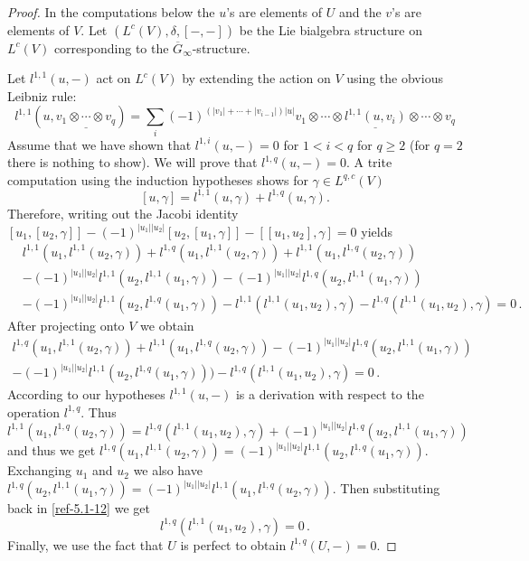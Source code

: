\documentclass{amsart}
\numberwithin{equation}{section}
\theoremstyle{definition}
\theoremstyle{remark}
\begin{document}
\begin{proof}
  In the computations below the $u$'s are elements of $U$ and the
  $v$'s are elements of $V$. Let $(L^c(V),\delta,[-,-])$ be the Lie
bialgebra structure on $L^c(V)$ corresponding to the $\overline{G}_\infty$-structure. 

Let $l^{1,1}(u,-)$ act on $L^{c}(V)$ by
  extending the action on $V$ using the obvious Leibniz rule:
\[
l^{1,1}(u,\underline{v_1\otimes \cdots \otimes  v_q})=
\sum_i (-1)^{(|v_1|+\cdots+|v_{i-1}|)|u|} \underline{v_1\otimes\cdots
\otimes l^{1,1}(u,v_i)\otimes\cdots \otimes v_q}
\]  
Assume
  that we have shown that $l^{1,i}(u,-)=0$ for $1<i<q$ for $q\ge 2$ (for
$q=2$ there is nothing to show). We
  will prove that $l^{1,q}(u,-)=0$. A trite computation using the
induction hypotheses shows for $\gamma\in L^{q,c}(V)$
\[
[u,\gamma]=l^{1,1}(u,\gamma)+l^{1,q}(u,\gamma).
\]
Therefore,
  writing out the Jacobi identity
  $[u_1,[u_2,\gamma]]-(-1)^{|u_1||u_2|}[u_2,[u_1,\gamma]]-[[u_1,u_2],\gamma]=0$ yields
\begin{align*}
& l^{1,1}(u_1,l^{1,1}(u_2,\gamma))+l^{1,q}(u_1,l^{1,1}(u_2,\gamma))
+l^{1,1}(u_1,l^{1,q}(u_2,\gamma))
\\
& -(-1)^{|u_1||u_2|}l^{1,1}(u_2,l^{1,1}(u_1,\gamma))
-(-1)^{|u_1||u_2|}l^{1,q}(u_2,l^{1,1}(u_1,\gamma))
\\
& -(-1)^{|u_1||u_2|}l^{1,1}(u_2,l^{1,q}(u_1,\gamma))
-l^{1,1}(l^{1,1}(u_1,u_2),\gamma)-l^{1,q}(l^{1,1}(u_1,u_2),\gamma)=0\,.
\end{align*}
After projecting onto $V$ we obtain 
\begin{multline}\label{ref-5.1-12}
l^{1,q}(u_1,l^{1,1}(u_2,\gamma))
+l^{1,1}(u_1,l^{1,q}(u_2,\gamma))
-(-1)^{|u_1||u_2|}l^{1,q}(u_2,l^{1,1}(u_1,\gamma))\\
-(-1)^{|u_1||u_2|}l^{1,1}(u_2,l^{1,q}(u_1,\gamma))
)-l^{1,q}(l^{1,1}(u_1,u_2),\gamma)=0\,.
\end{multline}
According to our hypotheses $l^{1,1}(u,-)$ is a derivation with respect to 
the operation $l^{1,q}$. Thus
\[
l^{1,1}(u_1,l^{1,q}(u_2,\gamma))=l^{1,q}(l^{1,1}(u_1,u_2),\gamma)+(-1)^{|u_1||u_2|}l^{1,q}(u_2,l^{1,1}(u_1,\gamma))
\]
and thus we get $l^{1,q}(u_1,l^{1,1}(u_2,\gamma))=(-1)^{|u_1||u_2|}l^{1,1}(u_2,l^{1,q}(u_1,\gamma))$. 
Exchanging $u_1$ and $u_2$ we also have
$l^{1,q}(u_2,l^{1,1}(u_1,\gamma))=(-1)^{|u_1||u_2|}l^{1,1}(u_1,l^{1,q}(u_2,\gamma))$. 
Then substituting back in \eqref{ref-5.1-12} we get 
\[
l^{1,q}(l^{1,1}(u_1,u_2),\gamma)=0\,.
\]
Finally, we use the fact that $U$ is perfect to obtain $l^{1,q}(U,-)=0$. 
\end{proof}
\end{document}
